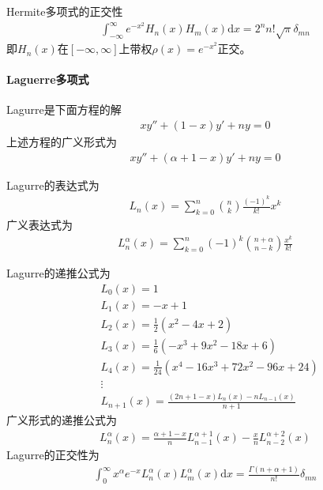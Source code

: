                 \par
                Hermite多项式的正交性
                \begin{align*}
                    \int_{-\infty}^{\infty} e^{-x^2} H_n(x)H_m(x) \mathrm{d}x  = 2^nn!\sqrt{\pi} \delta_{mn}
                \end{align*}
                即$H_n(x)$在$[-\infty,\infty]$上带权$\rho(x) = e^{-x^2}$正交。

                \paragraph{Laguerre多项式}
                Lagurre是下面方程的解
                \begin{align*}
                    xy'' + (1-x)y' +ny = 0
                \end{align*}
                上述方程的广义形式为
                \begin{align*}
                    xy'' + (\alpha +1-x)y' +ny = 0
                \end{align*}
                \par
                Lagurre的表达式为
                \begin{align}
                    \label{eq:Laguerre多项式一般形式}
                    L_n(x) = \sum_{k = 0}^n \binom{n}{k}\frac{(-1)^k}{k!}x^k
                \end{align}
                广义表达式为
                \begin{align*}
                    L_n^{\alpha}(x) = \sum_{k = 0}^n (-1)^k\binom{n+\alpha}{n-k}\frac{x^k}{k!}
                \end{align*}
                \par
                Lagurre的递推公式为
                \begin{align*}
                    &L_0(x) = 1\\
                    &L_1(x) = -x +1\\
                    &L_2(x) = \frac{1}{2} (x^2 - 4x +2)\\
                    &L_3(x) = \frac{1}{6} (-x^3+9x^2 - 18x + 6)\\
                    &L_4(x) = \frac{1}{24}(x^4 -16x^3 +72x^2 -96x +24)\\
                    &\vdots\\
                    &L_{n+1}(x) = \frac{(2n+1 -x)L_n(x) - nL_{n - 1}(x)}{n+1}
                \end{align*}
                广义形式的递推公式为
                \begin{align*}
                    L_n^\alpha (x) = \frac{\alpha + 1-x}{n}L_{n-1}^{\alpha+1} (x) - \frac{x}{n}L_{n-2}^{\alpha+2} (x)
                \end{align*}
                Lagurre的正交性为
                \begin{align*}
                    \int_0^{\infty} x^\alpha e^{-x}L_n^\alpha (x)L_m^\alpha (x) \mathrm{d}x = \frac{\Gamma(n+\alpha+1)}{n!}\delta_{mn}
                \end{align*}

